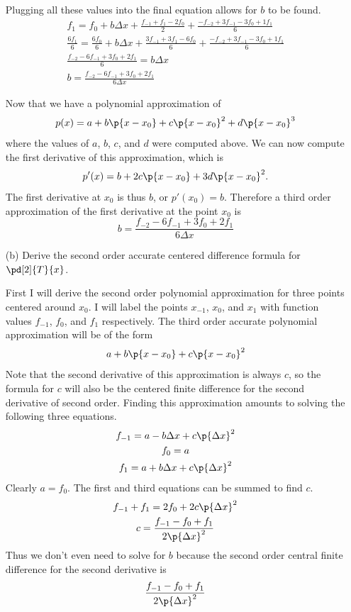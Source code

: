 \documentclass[11pt, oneside]{article}
\begin{document}
\begin{enumerate}
      Plugging all these values into the final equation allows for $b$ to be
      found.
      \begin{gather*}
        f_1 = f_0 + b \Delta x + \frac{f_{-1} + f_1 - 2 f_0}{2} + \frac{-f_{-2} + 3 f_{-1} - 3 f_0 + 1 f_1}{6} \\
        \frac{6f_1}{6} = \frac{6f_0}{6} + b \Delta x + \frac{3f_{-1} + 3f_1 - 6 f_0}{6} + \frac{-f_{-2} + 3 f_{-1} - 3 f_0 + 1 f_1}{6} \\
        \frac{f_{-2} - 6f_{-1} + 3f_0 + 2f_1}{6} =  b \Delta x \\
        b = \frac{f_{-2} - 6f_{-1} + 3f_0 + 2f_1}{6\Delta x}
      \end{gather*}

      Now that we have a polynomial approximation of
      \[
        p(x) = a + b\p{x - x_0} + c\p{x - x_0}^2 + d \p{x - x_0}^3
      \]
      where the values of $a$, $b$, $c$, and $d$ were computed above.
      We can now compute the first derivative of this approximation, which is
      \[
        p'(x) = b + 2c \p{x - x_0} + 3 d\p{x - x_0}^2.
      \]
      The first derivative at $x_0$ is thus $b$, or $p'(x_0) = b$.
      Therefore a third order approximation of the first derivative at the
      point $x_0$ is
      \[
        b = \frac{f_{-2} - 6f_{-1} + 3f_0 + 2f_1}{6\Delta x}
      \]

    \item[(b)] %
      Derive the second order accurate centered difference formula for
      $\pd[2]{T}{x}$.

      First I will derive the second order polynomial approximation for
      three points centered around $x_0$.
      I will label the points $x_{-1}$, $x_0$, and $x_1$ with function values
      $f_{-1}$, $f_0$, and $f_1$ respectively.
      The third order accurate polynomial approximation will be of the form
      \[
        a + b \p{x - x_0} + c \p{x - x_0}^2
      \]
      Note that the second derivative of this approximation is always $c$, so
      the formula for $c$ will also be the centered finite difference for the
      second derivative of second order.
      Finding this approximation amounts to solving the following three equations.
      \begin{gather*}
        f_{-1} = a - b \Delta x + c \p{\Delta x}^2 \\
        f_0 = a \\
        f_1 = a + b \Delta x + c \p{\Delta x}^2
      \end{gather*}
      Clearly $a = f_0$.
      The first and third equations can be summed to find $c$.
      \begin{gather*}
        f_{-1} + f_1 = 2f_0 + 2 c \p{\Delta x}^2 \\
        c = \frac{f_{-1} - f_0 + f_1}{2 \p{\Delta x}^2}
      \end{gather*}
      Thus we don't even need to solve for $b$ because the second order 
      central finite difference for the second derivative is
      \[
        \frac{f_{-1} - f_0 + f_1}{2 \p{\Delta x}^2}
      \]


\end{enumerate}
\end{document}
